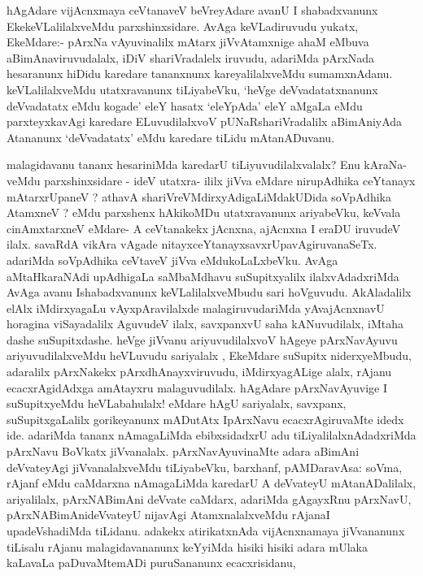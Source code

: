 \begin{artha}
hAgAdare vijAcnxmaya ceVtanaveV beVreyAdare avanU I shabadxvanunx
EkekeVLalilalxveMdu parxshinxsidare. AvAga keVLadiruvudu yukatx,
EkeMdare:- pArxNa vAyuvinalilx mAtarx jiVvAtamxnige ahaM eMbuva
aBimAnaviruvudalalx, iDiV shariVradalelx iruvudu, adariMda pArxNada
hesaranunx hiDidu karedare tananxnunx kareyalilalxveMdu sumamxnAdanu.
keVLalilalxveMdu utatxravanunx tiLiyabeVku, `heVge deVvadatatxnanunx
deVvadatatx eMdu kogade' eleY hasatx `eleYpAda' eleY aMgaLa eMdu
parxteyxkavAgi karedare ELuvudilalxvoV pUNaRshariVradalilx aBimAniyAda
Atananunx `deVvadatatx' eMdu karedare tiLidu mAtanADuvanu. 
\end{artha}

\begin{artha}
malagidavanu tananx hesariniMda karedarU tiLiyuvudilalxvalalx? Enu
kAraNa\--veMdu parxshinxsidare - ideV utatxra- ililx jiVva eMdare
nirupAdhika ceYtanayx mAtarx\-rUpaneV ? athavA
shariVreVMdirxyAdigaLiMdakUDida soVpAdhika AtamxneV ? eMdu parxshenx
hAkikoMDu utatxravanunx ariyabeVku, keVvala cinAmxtarxneV eMdare- A
ceVtana\-kekx jAcnxna, ajAcnxna I eraDU iruvudeV ilalx. savaRdA vikAra
vAgade nitayxceYtanayx\-savxrUpavAgiruvanaSeTx. adariMda soVpAdhika
ceVtaveV jiVva eMdukoLaLxbeVku. AvAga aMtaHkaraNAdi upAdhigaLa
saMbaMdhavu suSupitxyalilx ilalxvAdadxriMda \-AvAga avanu Ishabadxvanunx
keVLalilalxveMbudu sari hoVguvudu. AkAladalilx elAlx iMdirxyagaLu
vAyxpAravilalxde malagiruvudariMda yAvajAcnxnavU hora\-gina viSayadalilx
AguvudeV ilalx, savxpanxvU saha kANuvudilalx, iMtaha dashe
suSupitx\-dashe. heVge jiVvanu ariyuvudilalxvoV hAgeye pArxNavAyuvu
ariyuvudilalx\-veMdu heVLuvudu sariyalalx , EkeMdare suSupitx
niderxyeMbudu, adaralilx \-pArxNakekx pArxdhAnayx\-viruvudu,
iMdirxyagALige alalx, rAjanu ecacxrAgidAdxga amAtayxru
mala\-guvudilalx. hAgAdare pArxNavAyuvige I suSupitxyeMdu heVLabahulalx! \-eMdare hAgU  sariyalalx, savxpanx, suSupitxgaLalilx gorikeyanunx
mADutAtx IpArxNavu ecacxrAgi\-ruvaMte idedx ide. adariMda tananx
nAmagaLiMda ebibxsidadxrU adu tiLiyalilalx\-nAdadxriMda pArxNavu BoVkatx
jiVvanalalx. pArxNavAyuvinaMte adara aBimAni deVvate\-yAgi
jiVvanalalxveMdu tiLiyabeVku, barxhanf, pAMDaravAsa: soVma, rAjanf eMdu
caMdarxna nAmagaLiMda karedarU A deVvateyU mAtanADalilalx,
ariyalilalx, pArxNABimAni deVvate caMdarx, adariMda gAgayxRnu
pArxNavU, pArxNABimAnideV\-vateyU nijavAgi AtamxnalalxveMdu rAjanaI
upadeVshadiMda tiLidanu. adakekx atirikatx\-nAda vijAcnxnamaya
jiVvananunx tiLisalu rAjanu malagidavananunx keYyiMda hisiki hisiki
adara mUlaka kaLavaLa paDuvaMtemADi puruSananunx ecacxrisidanu,

\end{artha}
